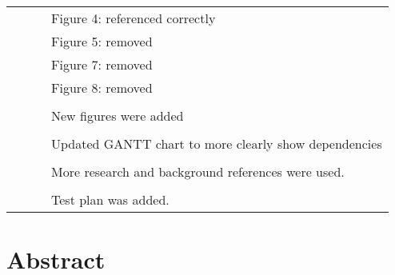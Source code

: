 \begin{table} [H]
\begin{tabular}{|l|l|l|l|}
	      &			 &				   & Figure 4: referenced correctly\\
	      &          &                 & Figure 5: removed\\
	      &			 &				   & Figure 7: removed\\
	      &			 &				   & Figure 8: removed\\
	      &			 &				   &	\\
	      &			 & 				   & New figures were added\\
	      &			 &				   &	\\
	      &			 &				   & Updated GANTT chart to more clearly show dependencies\\
	      &			 &				   &	\\
	      &			 &				   & More research and background references were used.\\
	      &			 &				   &	\\
	      &			 &				   & Test plan was added.\\
	      
		\hline
	\end{tabular} 
\end{table}
 \newpage
 \thispagestyle{empty}
 \section*{Abstract}

